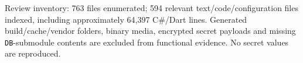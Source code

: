 Review inventory: 763 files enumerated; 594 relevant text/\allowbreak{}code/\allowbreak{}configuration files indexed, including approximately 64,397 C\#/\allowbreak{}Dart lines. Generated build/\allowbreak{}cache/\allowbreak{}vendor folders, binary media, encrypted secret payloads and missing \texttt{DB}-submodule contents are excluded from functional evidence. No secret values are reproduced.
